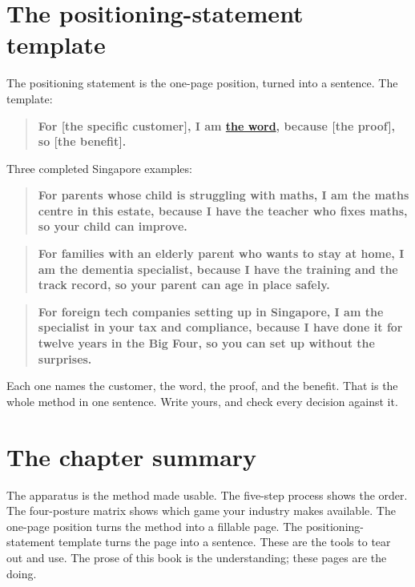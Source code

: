 \documentclass[10pt,twoside,openany]{memoir}
\newcommand{\needspacehead}{\needspace{4\baselineskip}}
\let\oldsection\section
\renewcommand{\section}{\needspacehead\oldsection}
\begin{document}
{{{{{\section{The positioning-statement
template}\label{the-positioning-statement-template}

The positioning statement is the one-page position, turned into a
sentence. The template:

\begin{quote}
\textbf{For {[}the specific customer{]}, I am \hyperref[the-word]{the
word}, because {[}the proof{]}, so {[}the benefit{]}.}
\end{quote}

Three completed Singapore examples:

\begin{quote}
\textbf{For parents whose child is struggling with maths, I am the maths
centre in this estate, because I have the teacher who fixes maths, so
your child can improve.}
\end{quote}

\begin{quote}
\textbf{For families with an elderly parent who wants to stay at home, I
am the dementia specialist, because I have the training and the track
record, so your parent can age in place safely.}
\end{quote}

\begin{quote}
\textbf{For foreign tech companies setting up in Singapore, I am the
specialist in your tax and compliance, because I have done it for twelve
years in the Big Four, so you can set up without the surprises.}
\end{quote}

Each one names the customer, the word, the proof, and the benefit. That
is the whole method in one sentence. Write yours, and check every
decision against it.

\section{The chapter summary}\label{the-chapter-summary}

The apparatus is the method made usable. The five-step process shows the
order. The four-posture matrix shows which game your industry makes
available. The one-page position turns the method into a fillable page.
The positioning-statement template turns the page into a sentence. These
are the tools to tear out and use. The prose of this book is the
understanding; these pages are the doing.

}}}}}
\end{document}
